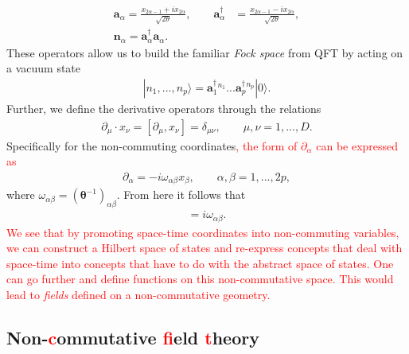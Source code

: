     \begin{align}
        \bm{a}_{\alpha} = \frac{x_{2\alpha-1} +i x_{2\alpha}}{\sqrt{2 \theta}}, \qquad \bm{a}^{\dag}_{\alpha} &= \frac{x_{2\alpha-1} -i x_{2\alpha}}{\sqrt{2 \theta}}, \\
        \bm{n}_{\alpha} = \bm{a}^{\dag}_{\alpha}\bm{a}_{\alpha}.
    \end{align}
    These operators allow us to build the familiar \textit{Fock space} from QFT by acting on a vacuum state
    \begin{align}
        |n_1,...,n_p\rangle=  \bm{a}^{\dag}_1^{n_1}... \bm{a}^{\dag}_p^{n_p}|0\rangle.
    \end{align}
Further, we define the derivative operators through the relations
    \begin{align}
        \partial_{\mu} \cdot x_{\nu} = [\partial_{\mu}, x_{\nu}] = \delta_{\mu \nu}, \qquad \mu,\nu = 1,...,D.
    \end{align}
    Specifically for the non-commuting coordinates\textcolor{red}{, the form of $\partial_{\alpha}$ can be expressed as }
    \begin{align}
        \partial_{\alpha}= -i \omega_{\alpha \beta} x_{\beta}, \qquad \alpha, \beta = 1,...,2p,
    \end{align}
    where $\omega_{\alpha \beta} = \left({ \bm \theta}^{-1} \right)_{\alpha \beta}$. From here it follows that
    \begin{align}
        [\partial_{\alpha}, \partial_{\beta}] = i \omega_{\alpha \beta}.
    \end{align}
\textcolor{red}{We see that by promoting space-time coordinates into non-commuting variables, we can construct a Hilbert space of states and re-express concepts that deal with space-time into concepts that have to do with the abstract space of states. One can go further and define functions on this non-commutative space. This would lead to \textit{fields} defined on a non-commutative geometry. }


    \subsection{Non-\textcolor{red}{c}ommutative \textcolor{red}{f}ield \textcolor{red}{t}heory}

